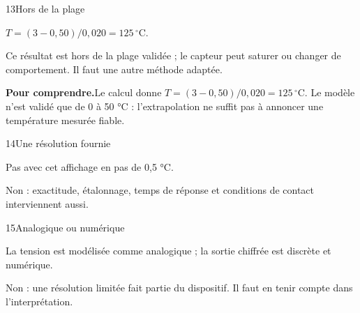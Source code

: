 \par\noindent\begin{minipage}{\linewidth}
\begin{corrige}{13}{Hors de la plage}
\begin{questions}
\item $T=(3-0{,}50)/0{,}020=125\,^{\circ}\mathrm C$.
\item Ce résultat est hors de la plage validée ; le capteur peut saturer ou changer de comportement. Il faut une autre méthode adaptée.
\end{questions}
\par\smallskip\noindent\textbf{Pour comprendre.}\enspace Le calcul donne $T=(3-0{,}50)/0{,}020=125\,^{\circ}\mathrm C$. Le modèle n’est validé que de 0 à 50 °C : l’extrapolation ne suffit pas à annoncer une température mesurée fiable.\par
{}
\end{corrige}
\end{minipage}
\par\noindent\begin{minipage}{\linewidth}
\begin{corrige}{14}{Une résolution fournie}
\begin{questions}
\item Pas avec cet affichage en pas de 0,5 °C.
\item Non : exactitude, étalonnage, temps de réponse et conditions de contact interviennent aussi.
\end{questions}
\end{corrige}
\end{minipage}
\par\noindent\begin{minipage}{\linewidth}
\begin{corrige}{15}{Analogique ou numérique}
\begin{questions}
\item La tension est modélisée comme analogique ; la sortie chiffrée est discrète et numérique.
\item Non : une résolution limitée fait partie du dispositif. Il faut en tenir compte dans l’interprétation.
\end{questions}
\end{corrige}
\end{minipage}
